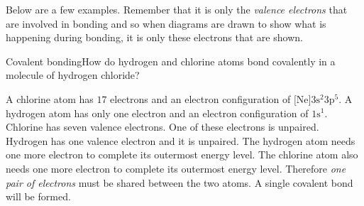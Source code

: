 \label{m38704*id138991}Below are a few examples. Remember that it is only the \textsl{valence electrons} that are involved in bonding and so when diagrams are drawn to show what is happening during bonding, it is only these electrons that are shown. \par 
\label{m38704*secfhsst!!!underscore!!!id98} 
\begin{wex}{Covalent bonding}{How do hydrogen and chlorine atoms bond covalently in a molecule of hydrogen chloride?}{
A chlorine atom has $17$ electrons and an electron configuration of $\text{[Ne]}3\text{s}^{2}3\text{p}^{5}$. A hydrogen atom has only one electron and an electron configuration of $1\text{s}^{1}$.
Chlorine has seven valence electrons. One of these electrons is unpaired. Hydrogen has one valence electron and it is unpaired.
The hydrogen atom needs one more electron to complete its outermost energy level. The chlorine atom also needs one more electron to complete its outermost energy level. Therefore \textit{one pair of electrons} must be shared between the two atoms. A single covalent bond will be formed.
\begin{figure}[H]
\begin{center}
\end{center}
\label{fig:bonding:hydrogen chloride}
\end{figure}
}
\end{wex}
